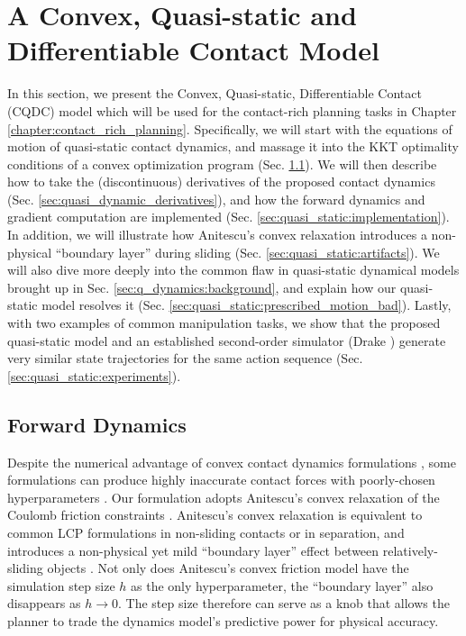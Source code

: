 \section{A Convex, Quasi-static and Differentiable Contact Model} \label{sec:q_dynamics:cqdc}
In this section, we present the Convex, Quasi-static, Differentiable Contact (CQDC) model which will be used for the contact-rich planning tasks in Chapter \ref{chapter:contact_rich_planning}. Specifically, we will start with the equations of motion of quasi-static contact dynamics, and massage it into the KKT optimality conditions of a convex optimization program (Sec. \ref{sec:convex_quasi_dynamic_contact_dynamics}). We will then describe how to take the (discontinuous) derivatives of the proposed contact dynamics (Sec. \ref{sec:quasi_dynamic_derivatives}), and how the forward dynamics and gradient computation are implemented (Sec. \ref{sec:quasi_static:implementation}). In addition, we will illustrate how Anitescu's convex relaxation introduces a non-physical ``boundary layer'' during sliding (Sec. \ref{sec:quasi_static:artifacts}). We will also dive more deeply into the common flaw in quasi-static dynamical models brought up in Sec. \ref{sec:q_dynamics:background}, and explain how our quasi-static model resolves it (Sec. \ref{sec:quasi_static:prescribed_motion_bad}). Lastly, with two examples of common manipulation tasks, we show that the proposed quasi-static model and an established second-order simulator (Drake \cite{drake}) generate very similar state trajectories for the same action sequence (Sec. \ref{sec:quasi_static:experiments}). 

\subsection{Forward Dynamics} \label{sec:convex_quasi_dynamic_contact_dynamics}
Despite the numerical advantage of convex contact dynamics formulations \cite{anitescu2006optimization, todorov2012mujoco, castro2021unconstrained}, some formulations can produce highly inaccurate contact forces with poorly-chosen hyperparameters \cite{kolbert2016experimental}. Our formulation adopts Anitescu's convex relaxation of the Coulomb friction constraints \cite{anitescu2006optimization}. Anitescu's convex relaxation is equivalent to common LCP formulations \cite{stewart2000rigid} in non-sliding contacts or in separation, and introduces a non-physical yet mild ``boundary layer'' effect between relatively-sliding objects \cite{pang2021convex, castro2021unconstrained}. Not only does Anitescu's convex friction model have the simulation step size $h$ as the only hyperparameter, the ``boundary layer'' also disappears as $h \rightarrow 0$. The step size therefore can serve as a knob that allows the planner to trade the dynamics model's predictive power for physical accuracy.

